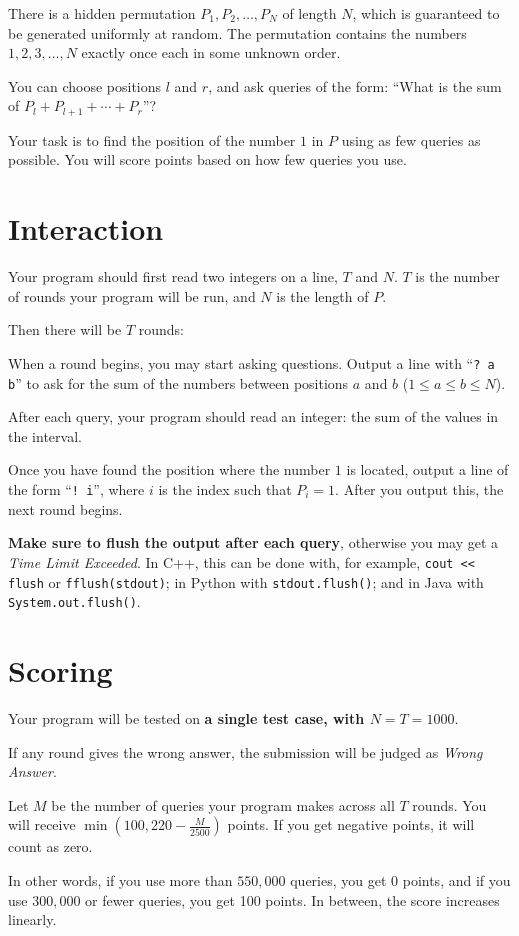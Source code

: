 
There is a hidden permutation $P_{1},P_{2},\ldots,P_{N}$ of length $N$, which is guaranteed to be generated uniformly at random.
The permutation contains the numbers $1, 2, 3, \ldots, N$ exactly once each in some unknown order.

You can choose positions $l$ and $r$, and ask queries of the form: ``What is the sum of $P_l + P_{l+1} + \cdots + P_r$''?

Your task is to find the position of the number $1$ in $P$ using as few queries as possible.
You will score points based on how few queries you use.

\section*{Interaction}

Your program should first read two integers on a line, $T$ and $N$.
$T$ is the number of rounds your program will be run, and $N$ is the length of $P$.

Then there will be $T$ rounds:

When a round begins, you may start asking questions. Output a line with ``\verb|? a b|'' to
ask for the sum of the numbers between positions $a$ and $b$ ($1 \leq a \leq b \leq N$).

After each query, your program should read an integer: the sum of the values in the interval.

Once you have found the position where the number $1$ is located, output a line of the form ``\verb|! i|'',
where $i$ is the index such that $P_i = 1$. After you output this, the next round begins.

\textbf{Make sure to flush the output after each query}, otherwise you may get a \textit{Time Limit Exceeded}.
In C++, this can be done with, for example, \texttt{cout << flush}
or \texttt{fflush(stdout)};
in Python with \texttt{stdout.flush()};
and in Java with \texttt{System.out.flush()}.

\section*{Scoring}

Your program will be tested on \textbf{a single test case, with $N = T = 1000$}.

If any round gives the wrong answer, the submission will be judged as \textit{Wrong Answer}.

Let $M$ be the number of queries your program makes across all $T$ rounds. You will receive
$\min(100, 220 - \frac{M}{2500})$ points. If you get negative points, it will count as zero.

In other words, if you use more than $550,000$ queries, you get 0 points, and
if you use $300,000$ or fewer queries, you get 100 points. In between, the score increases linearly.
